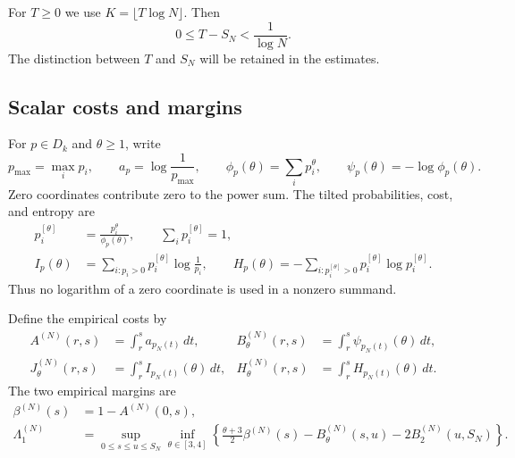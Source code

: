 \documentclass[11pt]{article}
\numberwithin{equation}{section}
\theoremstyle{definition}
\theoremstyle{remark}
\newcommand{\1}{\mathbf 1}
\begin{document}
For $T\ge0$ we use $K=\lfloor T\log N\rfloor$. Then
\begin{equation}%
\label{eq:horizon-rounding}
 0\le T-S_N<\frac1{\log N}.
\end{equation}
The distinction between $T$ and $S_N$ will be retained in the estimates.

\subsection{Scalar costs and margins}
\label{subsec:scalar-costs}

For $p\in D_k$ and $\theta\ge1$, write
\[
 p_{\max}=\max_i p_i,\qquad a_p=\log\frac1{p_{\max}},\qquad
 \phi_p(\theta)=\sum_i p_i^\theta,\qquad
 \psi_p(\theta)=-\log\phi_p(\theta).
\]
Zero coordinates contribute zero to the power sum. The tilted
probabilities, cost, and entropy are
\begin{align}%
\label{eq:tilted-costs}
 p_i^{[\theta]}&=\frac{p_i^\theta}{\phi_p(\theta)},\qquad
 \sum_i p_i^{[\theta]}=1,\nonumber\\
 I_p(\theta)&=\sum_{i:p_i>0}p_i^{[\theta]}\log\frac1{p_i},\qquad
 H_p(\theta)=-\sum_{i:p_i^{[\theta]}>0}p_i^{[\theta]}\log p_i^{[\theta]}.
\end{align}
Thus no logarithm of a zero coordinate is used in a nonzero summand.

Define the empirical costs by
\begin{align*}
 A^{(N)}(r,s)&=\int_r^s a_{p_N(t)}\,dt,&
 B^{(N)}_\theta(r,s)&=\int_r^s\psi_{p_N(t)}(\theta)\,dt,\\
 J^{(N)}_\theta(r,s)&=\int_r^s I_{p_N(t)}(\theta)\,dt,&
 H^{(N)}_\theta(r,s)&=\int_r^s H_{p_N(t)}(\theta)\,dt.
\end{align*}
The two empirical margins are
\begin{align}%
\label{eq:empirical-margins}
 \beta^{(N)}(s)&=1-A^{(N)}(0,s),\nonumber\\
 \Lambda_1^{(N)}&=\sup_{0\le s\le u\le S_N}\inf_{\theta\in[3,4]}
 \left\{\frac{\theta+3}{2}\beta^{(N)}(s)
       -B^{(N)}_\theta(s,u)-2B^{(N)}_2(u,S_N)\right\}.
\end{align}
\end{document}
